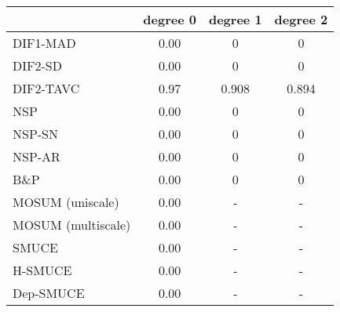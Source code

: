 \begin{tabular}{|l|c|c|c|}
  \hline
 & degree 0 & degree 1 & degree 2 \\ 
  \hline
DIF1-MAD & 0.00 & 0 & 0 \\ 
  DIF2-SD & 0.00 & 0 & 0 \\ 
  DIF2-TAVC & 0.97 & 0.908 & 0.894 \\ 
  NSP & 0.00 & 0 & 0 \\ 
  NSP-SN & 0.00 & 0 & 0 \\ 
  NSP-AR & 0.00 & 0 & 0 \\ 
  B\&P & 0.00 & 0 & 0 \\ 
  MOSUM (uniscale) & 0.00 & - & - \\ 
  MOSUM (multiscale) & 0.00 & - & - \\ 
  SMUCE & 0.00 & - & - \\ 
  H-SMUCE & 0.00 & - & - \\ 
  Dep-SMUCE & 0.00 & - & - \\ 
   \hline
\end{tabular}

